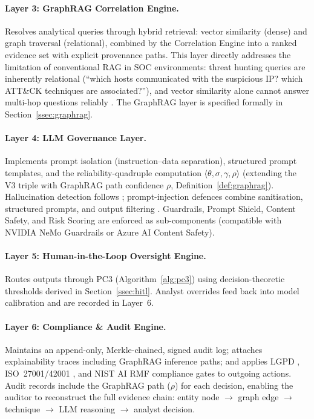 \documentclass[preprint,12pt,authoryear]{elsarticle}
\begin{document}
\paragraph{Layer 3: GraphRAG Correlation Engine.}
\label{ssec:graphrag-layer}
Resolves analytical queries through hybrid retrieval: vector similarity (dense) and
graph traversal (relational), combined by the Correlation Engine into a ranked
evidence set with explicit provenance paths.
This layer directly addresses the limitation of conventional RAG in SOC environments:
threat hunting queries are inherently relational (``which hosts communicated with
the suspicious IP? which ATT\&CK techniques are associated?''), and vector similarity
alone cannot answer multi-hop questions reliably \citep{cyberrag2025}.
The GraphRAG layer is specified formally in Section~\ref{ssec:graphrag}.

\paragraph{Layer 4: LLM Governance Layer.}
Implements prompt isolation (instruction--data separation), structured prompt templates,
and the reliability-quadruple computation $\langle\theta, \sigma, \gamma, \rho\rangle$
(extending the V3 triple with GraphRAG path confidence $\rho$, Definition~\ref{def:graphrag}).
Hallucination detection follows \citet{manakul2023selfcheckgpt};
prompt-injection defences combine sanitisation, structured prompts, and output filtering
\citep{liu2024formalizing,greshake2023indirect}.
Guardrails, Prompt Shield, Content Safety, and Risk Scoring are enforced as sub-components
(compatible with NVIDIA NeMo Guardrails or Azure AI Content Safety).

\paragraph{Layer 5: Human-in-the-Loop Oversight Engine.}
Routes outputs through PC3 (Algorithm~\ref{alg:pc3}) using decision-theoretic thresholds
derived in Section~\ref{ssec:hitl}.
Analyst overrides feed back into model calibration and are recorded in Layer~6.

\paragraph{Layer 6: Compliance \& Audit Engine.}
Maintains an append-only, Merkle-chained, signed audit log;
attaches explainability traces including GraphRAG inference paths;
and applies LGPD \citep{lgpd2018}, ISO~27001/42001 \citep{iso27001,iso42001},
and NIST AI RMF \citep{nist2023airmf,nist2024genai} compliance gates to outgoing actions.
Audit records include the GraphRAG path ($\rho$) for each decision,
enabling the auditor to reconstruct the full evidence chain:
entity node $\to$ graph edge $\to$ technique $\to$ LLM reasoning $\to$ analyst decision.
\end{document}
